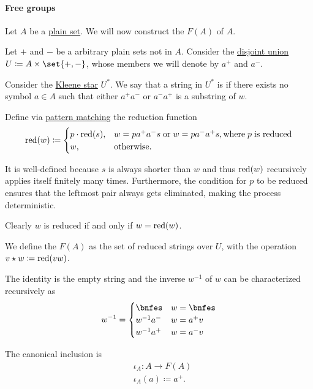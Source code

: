 \paragraph{Free groups}

\begin{definition}\label{def:free_group}\mimprovised
  Let \( A \) be a \hyperref[def:set]{plain set}. We will now construct the  \( F(A) \) of \( A \).

  Let \( + \) and \( - \) be a arbitrary plain sets not in \( A \). Consider the \hyperref[def:disjoint_union]{disjoint union} \( U \coloneqq A \times \set{ +, - } \), whose members we will denote by \( a^+ \) and \( a^- \).

  Consider the \hyperref[def:formal_language/kleene_star]{Kleene star} \( U^* \). We say that a string in \( U^* \) is  if there exists no symbol \( a \in A \) such that either \( a^+ a^- \) or \( a^- a^+ \) is a substring of \( w \).

  Define via \hyperref[con:evaluation]{pattern matching} the reduction function
  \begin{equation*}
    \red(w) \coloneqq \begin{cases}
      p \cdot \red(s), &w = p a^+ a^- s \T{or} w = p a^- a^+ s, \T{where} p \T{is reduced} \\
      w,               &\T{otherwise.}
    \end{cases}
  \end{equation*}

  It is well-defined because \( s \) is always shorter than \( w \) and thus \( \operatorname{red}(w) \) recursively applies itself finitely many times. Furthermore, the condition for \( p \) to be reduced ensures that the leftmost pair always gets eliminated, making the process deterministic.

  Clearly \( w \) is reduced if and only if \( w = \operatorname{red}(w) \).

  We define the  \( F(A) \) as the set of reduced strings over \( U \), with the operation \( v \star w \coloneqq \operatorname{red}(vw) \).

  The identity is the empty string and the inverse \( w^{-1} \) of \( w \) can be characterized recursively as
  \begin{equation*}
    w^{-1} = \begin{cases}
      \bnfes &w = \bnfes \\
      w^{-1} a^-  &w = a^+ v \\
      w^{-1} a^+  &w = a^- v
    \end{cases}
  \end{equation*}

  The canonical inclusion is
  \begin{equation*}
    \begin{aligned}
      &\iota_A: A \to F(A) \\
      &\iota_A(a) \coloneqq a^+.
    \end{aligned}
  \end{equation*}
\end{definition}
